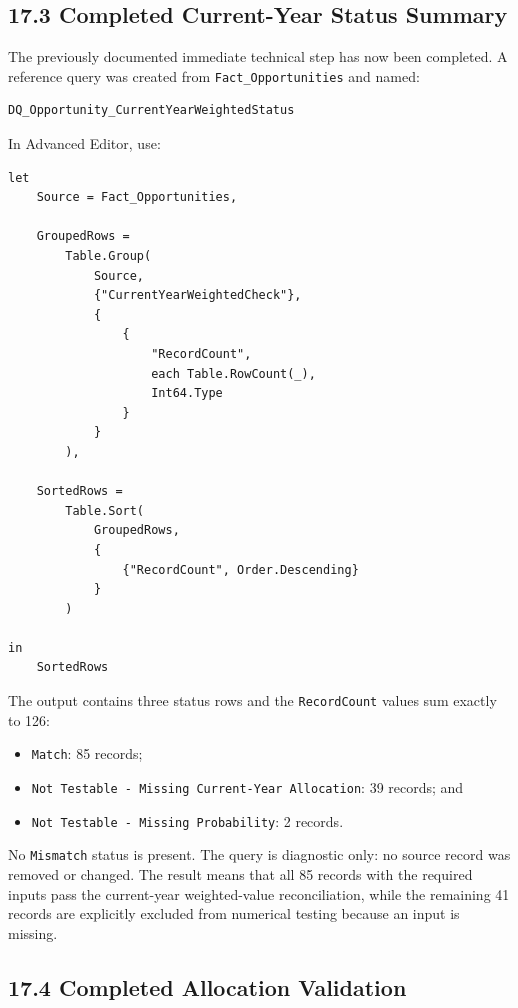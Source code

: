 \documentclass[11pt,a4paper]{article}
\begin{document}
\subsection{17.3 Completed Current-Year Status Summary}

The previously documented immediate technical step has now been completed.
A reference query was created from \texttt{Fact\_Opportunities} and named:

\begin{lstlisting}[style=powerquery]
DQ_Opportunity_CurrentYearWeightedStatus
\end{lstlisting}

In Advanced Editor, use:

\begin{lstlisting}[style=powerquery]
let
    Source = Fact_Opportunities,

    GroupedRows =
        Table.Group(
            Source,
            {"CurrentYearWeightedCheck"},
            {
                {
                    "RecordCount",
                    each Table.RowCount(_),
                    Int64.Type
                }
            }
        ),

    SortedRows =
        Table.Sort(
            GroupedRows,
            {
                {"RecordCount", Order.Descending}
            }
        )

in
    SortedRows
\end{lstlisting}

The output contains three status rows and the \texttt{RecordCount} values sum
exactly to 126:

\begin{itemize}[leftmargin=7mm,itemsep=2pt]
    \item \texttt{Match}: 85 records;
    \item \texttt{Not Testable - Missing Current-Year Allocation}: 39 records; and
    \item \texttt{Not Testable - Missing Probability}: 2 records.
\end{itemize}

No \texttt{Mismatch} status is present. The query is diagnostic only: no source
record was removed or changed. The result means that all 85 records with the
required inputs pass the current-year weighted-value reconciliation, while the
remaining 41 records are explicitly excluded from numerical testing because an
input is missing.

\subsection{17.4 Completed Allocation Validation}
\end{document}
